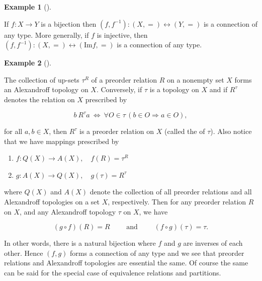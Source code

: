 \documentclass[
  letterpaper,
  10pt,
  reqno,
  twopage,
  openany]{book}
\providecommand{\tightlist}{%
  \setlength{\itemsep}{0pt}\setlength{\parskip}{0pt}}\usepackage{longtable,booktabs,array}
\theoremstyle{plain}
\theoremstyle{definition}
\theoremstyle{definition}
\theoremstyle{definition}
\newtheorem{example}{Example}[chapter]
\theoremstyle{plain}
\theoremstyle{plain}
\theoremstyle{remark}
\begin{document}
\leavevmode{}%
\begin{example}[]\label{exm-bijection-connection}

If \(f:X\to Y\) is a bijection then
\((f,f^{-1}):(X,=)\leftrightarrow (Y,=)\) is a connection of any type.
More generally, if \(f\) is injective, then
\((f,f^{-1}):(X,=)\leftrightarrow (\text{Im} f,=)\) is a connection of
any type.

\end{example}

\leavevmode{}%
\begin{example}[]\label{exm-alexandconn}

The collection of up-sets \(\tau^R\) of a preorder relation \(R\) on a
nonempty set \(X\) forms an Alexandroff topology on \(X\). Conversely,
if \(\tau\) is a topology on \(X\) and if \(R^\tau\) denotes the
relation on \(X\) prescribed by

\begin{equation}
b \ R^\tau a \ \Leftrightarrow \ \forall O\in \tau\, ( b\in O \Rightarrow a\in O ), 
\end{equation}

for all \(a,b\in X\), then \(R^\tau\) is a preorder relation on \(X\)
(called the  of \(\tau\)). Also notice that
we have mappings prescribed by

\begin{enumerate}
\def\labelenumi{\arabic{enumi}.}
\tightlist
\item
  \(f:Q(X)\to A(X), \quad f(R)=\tau^R\)\\
\item
  \(g:A(X)\to Q(X), \quad g(\tau)=R^\tau\)
\end{enumerate}

where \(Q(X)\) and \(A(X)\) denote the collection of all preorder
relations and all Alexandroff topologies on a set \(X\), respectively.
Then for any preorder relation \(R\) on \(X\), and any Alexandroff
topology \(\tau\) on \(X\), we have

\begin{equation} 
(g\circ f)(R)=R 
\qquad \text{ and } \qquad
(f\circ g)(\tau)=\tau. 
\end{equation}

In other words, there is a natural bijection where \(f\) and \(g\) are
inverses of each other. Hence \((f,g)\) forms a connection of any type
and we see that preorder relations and Alexandroff topologies are
essential the same. Of course the same can be said for the special case
of equivalence relations and partitions.

\end{example}
\end{document}
